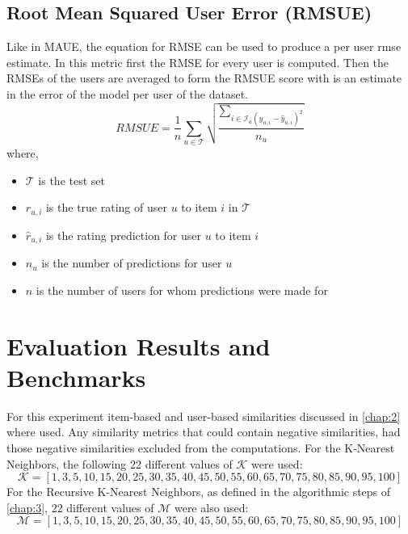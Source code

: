 \subsection{Root Mean Squared User Error (RMSUE)}
Like in MAUE, the equation for RMSE can be used to produce a per user rmse estimate.
In this metric first the RMSE for every user is computed. Then the RMSEs of
the users are averaged to form the RMSUE score with is an estimate in the
error of the model per user of the dataset.
$$RMSUE = \frac{1}{n}\sum_{u \in \mathcal{T}}\sqrt{\frac{\sum_{i \in \mathcal{I}_u(y_{u,i} - \hat{y}_{u,i})^2}}{n_u}}$$
where,
\begin{itemize}
	\item[] $\mathcal{T}$ is the test set
	\item[] $r_{u,i}$ is the true rating of user $u$ to item $i$ in $\mathcal{T}$
	\item[] $\hat{r}_{u,i}$ is the rating prediction for user $u$ to item $i$
	\item[] $n_u$ is the number of predictions for user $u$
	\item[] $n$ is the number of users for whom predictions were made for
\end{itemize}

\section{Evaluation Results and Benchmarks}\label{sec:4.3}
For this experiment item-based and user-based similarities discussed in \autoref{chap:2} where used.
Any similarity metrics that could contain
negative similarities, had those negative similarities excluded from the
computations.
For the K-Nearest Neighbors, the following 22 different values
of $\mathcal{K}$ were used:
$$\mathcal{K} = [1, 3, 5, 10, 15, 20, 25, 30, 35, 40, 45, 50, 55, 60, 65, 70, 75, 80, 85, 90, 95, 100]$$
For the Recursive K-Nearest Neighbors, as defined in the
algorithmic steps of \autoref{chap:3}, 22 different values of $\mathcal{M}$
were also used:
$$\mathcal{M} = [1, 3, 5, 10, 15, 20, 25, 30, 35, 40, 45, 50, 55, 60, 65, 70, 75, 80, 85, 90, 95, 100]$$

